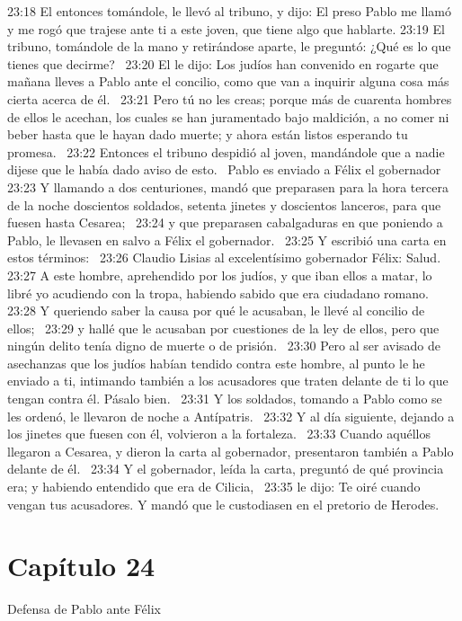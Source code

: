 23:18 El entonces tomándole, le llevó al tribuno, y dijo: El preso Pablo me llamó y me rogó que trajese ante ti a este joven, que tiene algo que hablarte. 
23:19 El tribuno, tomándole de la mano y retirándose aparte, le preguntó: ¿Qué es lo que tienes que decirme?  
23:20 El le dijo: Los judíos han convenido en rogarte que mañana lleves a Pablo ante el concilio, como que van a inquirir alguna cosa más cierta acerca de él.  
23:21 Pero tú no les creas; porque más de cuarenta hombres de ellos le acechan, los cuales se han juramentado bajo maldición, a no comer ni beber hasta que le hayan dado muerte; y ahora están listos esperando tu promesa.  
23:22 Entonces el tribuno despidió al joven, mandándole que a nadie dijese que le había dado aviso de esto.  
Pablo es enviado a Félix el gobernador  
23:23 Y llamando a dos centuriones, mandó que preparasen para la hora tercera de la noche doscientos soldados, setenta jinetes y doscientos lanceros, para que fuesen hasta Cesarea;  
23:24 y que preparasen cabalgaduras en que poniendo a Pablo, le llevasen en salvo a Félix el gobernador.  
23:25 Y escribió una carta en estos términos:  
23:26 Claudio Lisias al excelentísimo gobernador Félix: Salud.  
23:27 A este hombre, aprehendido por los judíos, y que iban ellos a matar, lo libré yo acudiendo con la tropa, habiendo sabido que era ciudadano romano.  
23:28 Y queriendo saber la causa por qué le acusaban, le llevé al concilio de ellos;  
23:29 y hallé que le acusaban por cuestiones de la ley de ellos, pero que ningún delito tenía digno de muerte o de prisión.  
23:30 Pero al ser avisado de asechanzas que los judíos habían tendido contra este hombre, al punto le he enviado a ti, intimando también a los acusadores que traten delante de ti lo que tengan contra él. Pásalo bien.  
23:31 Y los soldados, tomando a Pablo como se les ordenó, le llevaron de noche a Antípatris.  
23:32 Y al día siguiente, dejando a los jinetes que fuesen con él, volvieron a la fortaleza.  
23:33 Cuando aquéllos llegaron a Cesarea, y dieron la carta al gobernador, presentaron también a Pablo delante de él.  
23:34 Y el gobernador, leída la carta, preguntó de qué provincia era; y habiendo entendido que era de Cilicia,  
23:35 le dijo: Te oiré cuando vengan tus acusadores. Y mandó que le custodiasen en el pretorio de Herodes.  
\section*{Capítulo 24 }
Defensa de Pablo ante Félix  

